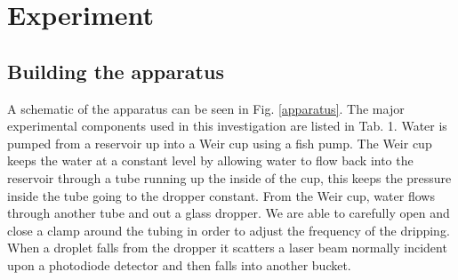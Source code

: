 \documentclass[11pt]{article}
\begin{document}
%
%




\section{Experiment}

\subsection{Building the apparatus}
A schematic of the apparatus can be seen in Fig. \ref{apparatus}. The major experimental components used in this investigation are listed in Tab. 1. Water is pumped from a reservoir up into a Weir cup using a fish pump. The Weir cup keeps the water at a constant level by allowing water to flow back into the reservoir through a tube running up the inside of the cup, this keeps the pressure inside the tube going to the dropper constant. From the Weir cup, water flows through another tube and out a glass dropper. We are able to carefully open and close a clamp around the tubing in order to adjust the frequency of the dripping. When a droplet falls from the dropper it scatters a laser beam normally incident upon a photodiode detector and then falls into another bucket. 
\end{document}
